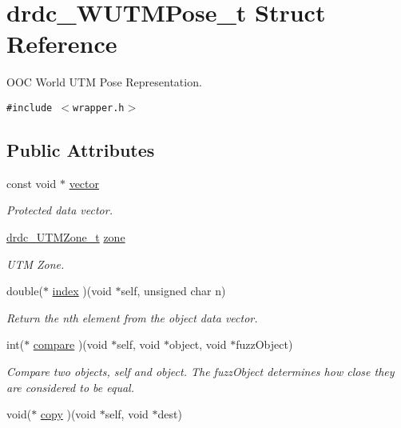 \hypertarget{structdrdc__WUTMPose__t}{
\section{drdc\_\-WUTMPose\_\-t Struct Reference}
\label{structdrdc__WUTMPose__t}
}
OOC World UTM Pose Representation.  


{\tt \#include $<$wrapper.h$>$}

\subsection*{Public Attributes}
\begin{CompactItemize}
\item 
const void $\ast$ \hyperlink{structdrdc__WUTMPose__t_043aefad0c7e8af8630dd883c00d2f9f}{vector}
\begin{CompactList}\small\item\em Protected data vector. \item\end{CompactList}\item 
\hyperlink{structdrdc__UTMZone__t}{drdc\_\-UTMZone\_\-t} \hyperlink{structdrdc__WUTMPose__t_a503d72607bcdbfd06eee395170ea3a3}{zone}
\begin{CompactList}\small\item\em UTM Zone. \item\end{CompactList}\item 
double($\ast$ \hyperlink{structdrdc__WUTMPose__t_76525c671870dbad775b4df26018cd33}{index} )(void $\ast$self, unsigned char n)
\begin{CompactList}\small\item\em Return the nth element from the object data vector. \item\end{CompactList}\item 
int($\ast$ \hyperlink{structdrdc__WUTMPose__t_e0f9e732d2e42856efaf5fb87f5e60c5}{compare} )(void $\ast$self, void $\ast$object, void $\ast$fuzzObject)
\begin{CompactList}\small\item\em Compare two objects, self and object. The fuzzObject determines how close they are considered to be equal. \item\end{CompactList}\item 
void($\ast$ \hyperlink{structdrdc__WUTMPose__t_9bf102e4e4c1777f04ddd277c05ba933}{copy} )(void $\ast$self, void $\ast$dest)

\end{CompactItemize}
